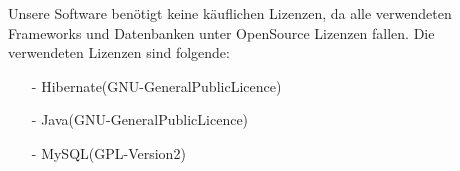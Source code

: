\documentclass[../../Pflichtenheft.tex]{subfiles}
\begin{document}
    Unsere Software benötigt keine käuflichen Lizenzen, da alle verwendeten Frameworks und Datenbanken unter OpenSource Lizenzen fallen.
    Die verwendeten Lizenzen sind folgende:
    \begin{itemize}
        \item[-] Hibernate(GNU-GeneralPublicLicence)
        \item[-] Java(GNU-GeneralPublicLicence)
        \item[-] MySQL(GPL-Version2)
    \end{itemize}
\end{document}
